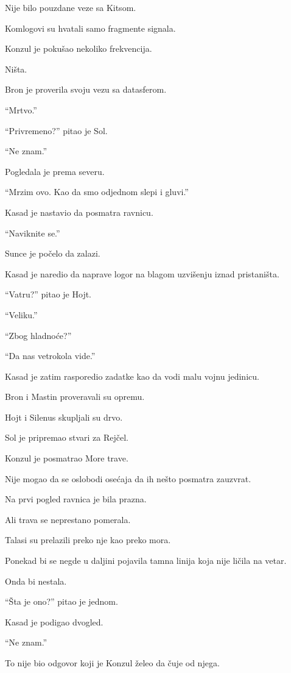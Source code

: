 Nije bilo pouzdane veze sa Kitsom.

Komlogovi su hvatali samo fragmente signala.

Konzul je pokušao nekoliko frekvencija.

Ništa.

Bron je proverila svoju vezu sa datasferom.

``Mrtvo.''

``Privremeno?'' pitao je Sol.

``Ne znam.''

Pogledala je prema severu.

``Mrzim ovo. Kao da smo odjednom slepi i gluvi.''

Kasad je nastavio da posmatra ravnicu.

``Naviknite se.''

\bigskip

Sunce je počelo da zalazi.

Kasad je naredio da naprave logor na blagom uzvišenju iznad pristaništa.

``Vatru?'' pitao je Hojt.

``Veliku.''

``Zbog hladnoće?''

``Da nas vetrokola vide.''

Kasad je zatim rasporedio zadatke kao da vodi malu vojnu jedinicu.

Bron i Mastin proveravali su opremu.

Hojt i Silenus skupljali su drvo.

Sol je pripremao stvari za Rejčel.

Konzul je posmatrao More trave.

Nije mogao da se oslobodi osećaja da ih nešto posmatra zauzvrat.

Na prvi pogled ravnica je bila prazna.

Ali trava se neprestano pomerala.

Talasi su prelazili preko nje kao preko mora.

Ponekad bi se negde u daljini pojavila tamna linija koja nije ličila na vetar.

Onda bi nestala.

``Šta je ono?'' pitao je jednom.

Kasad je podigao dvogled.

``Ne znam.''

To nije bio odgovor koji je Konzul želeo da čuje od njega.

\bigskip

